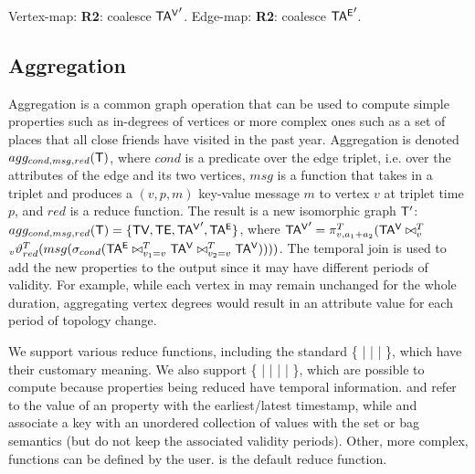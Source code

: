

Vertex-map: {\bf R2}: coalesce $\mathsf{TA^{V}}'$.  Edge-map: {\bf R2}: coalesce
$\mathsf{TA^{E}}'$.


\subsection{Aggregation}
\label{sec:algebra:agg}

Aggregation is a common graph operation that can be used to compute
simple properties such as in-degrees of vertices or more complex ones
such as a set of places that all close friends have visited in the
past year.  Aggregation is denoted $agg_{cond,msg,red}(\mathsf{T})$, where
$cond$ is a predicate over the edge triplet, i.e. over the attributes
of the edge and its two vertices, $msg$ is a function that takes in a
triplet and produces a $(v,p,m)$ key-value message $m$ to vertex $v$
at triplet time $p$, and $red$ is a reduce function.  The result is a
new isomorphic graph $\mathsf{T}'$: $agg_{cond,msg,red}(\mathsf{T}) = \{ \textsf{TV},
\textsf{TE}, \mathsf{TA^{V}}', \mathsf{TA^{E}} \}$, where $\mathsf{TA^{V}}' = \pi^T_{v,a_1+a_2}(\mathsf{TA^{V}}
\bowtie^T_v$ \\ $_v\vartheta^T_{red} (msg (\sigma_{cond} (\mathsf{TA^{E}}
\bowtie^T_{v_1=v} \mathsf{TA^{V}} \bowtie^T_{v_2=v} \mathsf{TA^{V}}))))$.  The temporal join
is used to add the new properties to the output since it may have
different periods of validity.  For example, while each vertex in \tg
may remain unchanged for the whole duration, aggregating vertex
degrees would result in an attribute value for each period of topology
change.

We support various reduce functions, including the standard \{
 |  |  |  \}, which have
their customary meaning.  We also support \{  |
 |  |  |  \}, which
are possible to compute because properties being reduced have temporal
information.   and  refer to the value of an
property with the earliest/latest timestamp, while  and
 associate a key with an unordered collection of values
with the set or bag semantics (but do not keep the associated validity
periods).  Other, more complex, functions can be defined by the user.
 is the default reduce function.

